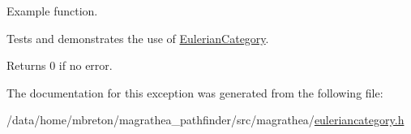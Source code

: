 Example function. 

Tests and demonstrates the use of \hyperlink{exceptionmagrathea_1_1EulerianCategory}{Eulerian\-Category}. \begin{DoxyReturn}{Returns}
0 if no error. 
\end{DoxyReturn}


The documentation for this exception was generated from the following file\-:\begin{DoxyCompactItemize}
\item 
/data/home/mbreton/magrathea\-\_\-pathfinder/src/magrathea/\hyperlink{euleriancategory_8h}{euleriancategory.\-h}\end{DoxyCompactItemize}

